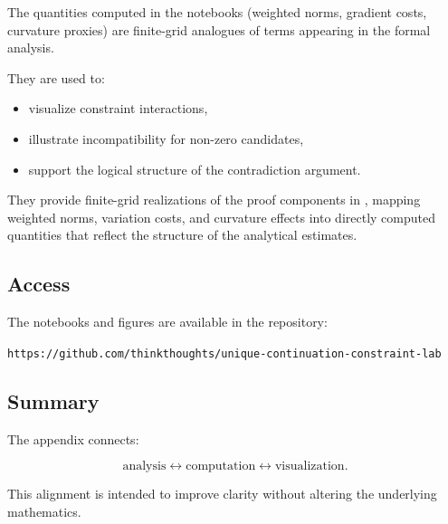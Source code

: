 The quantities computed in the notebooks (weighted norms, gradient costs, curvature proxies) are finite-grid analogues of terms appearing in the formal analysis.

They are used to:

\begin{itemize}
\item visualize constraint interactions,
\item illustrate incompatibility for non-zero candidates,
\item support the logical structure of the contradiction argument.
\end{itemize}

They provide finite-grid realizations of the proof components in \cite{EKPV2008, TaoPDE}, mapping weighted norms, variation costs, and curvature effects into directly computed quantities that reflect the structure of the analytical estimates.

\subsection{Access}

The notebooks and figures are available in the repository:

\begin{center}
\texttt{https://github.com/thinkthoughts/unique-continuation-constraint-lab}
\end{center}

\subsection{Summary}

The appendix connects:

\[
\text{analysis} \leftrightarrow \text{computation} \leftrightarrow \text{visualization}.
\]

This alignment is intended to improve clarity without altering the underlying mathematics.
